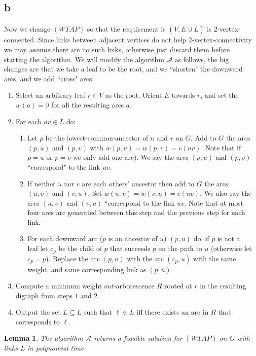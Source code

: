 \documentclass[letterpaper,12pt,oneside,onecolumn]{article}
\newcommand{\cA}{\mathcal{A}} \newcommand{\cB}{\mathcal{B}}
\newtheorem{lemma}[fact]{Lemma}
\begin{document}
\subsection{b}
\paragraph{}
Now we change $(WTAP)$ so that the requirement is $(V, E\cup \bar{L})$ is $2$-vertex-connected. Since links between adjacent vertices do not help $2$-vertex-connectivity we may assume there are no such links, otherwise just discard them before starting the algorithm. We will modify the algorithm $\cA$ as follows, the big changes are that we take a leaf to be the root, and we ``shorten" the downward arcs, and we add ``cross" arcs:
\begin{enumerate}
\item Select an arbitrary leaf $r \in V$ as the root. Orient $E$ towards $r$, and set the $w(a) = 0$ for all the resulting arcs $a$.
\item For each $uv \in L$ do:
	\begin{enumerate}
	\item Let $p$ be the lowest-common-ancestor of $u$ and $v$ on $G$. Add to $G$ the arcs $(p,u)$ and $(p,v)$ with $w(p,u) = w(p,v) = c(uv)$. Note that if $p=u$ or $p=v$ we only add one arc). We say the arcs $(p,u)$ and $(p,v)$ ``correspond" to the link $uv$.
	\item If neither $u$ nor $v$ are each others' ancestor then  add to $G$ the arcs $(u,v)$ and $(v,u)$. Set $w(u,v) = w(v,u) = c(uv)$. We also say the arcs $(u,v)$ and $(v,u)$ ``correspond to the link $uv$. Note that at most four arcs are generated between this step and the previous step for each link.
	\item For each downward arc ($p$ is an ancestor of $u$) $(p,u)$ do: if $p$ is not a leaf let $c_p$ be the child of $p$  that succeeds $p$ on the path to $u$ (otherwise let $c_p = p$). Replace the arc $(p,u)$ with the arc $(c_p, u)$ with the same weight, and same corresponding link as $(p,u)$.
	\end{enumerate}
\item Compute a minimum weight $out$-arborescence $R$ rooted at $r$ in the resulting digraph from steps $1$ and $2$.
\item Output the set $\bar{L} \subseteq L$ such that $\ell \in \bar{L}$ iff there exists an arc in $R$ that corresponds to $\ell$.
\end{enumerate}
\begin{lemma}\label{lemma:3b-poly}
The algorithm $\cA$ returns a feasible solution for $(WTAP)$ on $G$ with links $L$ in polynomial time.
\end{lemma}
\end{document}
